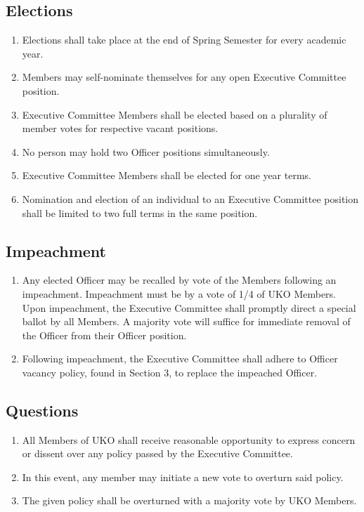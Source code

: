 \documentclass[12pt,executivepaper]{article}
\begin{document}
\subsection{Elections}
\begin{enumerate}
    \item Elections shall take place at the end of Spring Semester for every
          academic year.
    \item Members may self-nominate themselves for any open Executive Committee
          position.
    \item Executive Committee Members shall be elected based on a plurality of
          member votes for respective vacant positions.
    \item No person may hold two Officer positions simultaneously.
    \item Executive Committee Members shall be elected for one year terms.
    \item Nomination and election of an individual to an Executive Committee
          position shall be limited to two full terms in the same position.
\end{enumerate}

\subsection{Impeachment}
\begin{enumerate}
    \item Any elected Officer may be recalled by vote of the Members following an
          impeachment. Impeachment must be by a vote of 1/4 of UKO Members.
          Upon impeachment, the Executive Committee shall promptly direct a special
          ballot by all Members. A majority vote will suffice for immediate removal
          of the Officer from their Officer position.
    \item Following impeachment, the Executive Committee shall adhere to
          Officer vacancy policy, found in Section 3, to replace the impeached
          Officer.
\end{enumerate}

\subsection{Questions}
\begin{enumerate}
    \item All Members of UKO shall receive reasonable opportunity to express
          concern or dissent over any policy passed by the Executive Committee.
    \item In this event, any member may initiate a new vote to overturn said
          policy.
    \item The given policy shall be overturned with a majority vote by UKO
          Members.
\end{enumerate}
\end{document}
